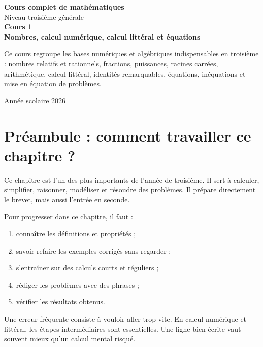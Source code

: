 \documentclass[11pt,a4paper]{article}
\begin{document}
\begin{titlepage}
\centering
\vspace*{2cm}
{\Huge \textbf{Cours complet de mathématiques}}\\[0.5cm]
{\Large Niveau troisième générale}\\[1.5cm]
{\Huge \textbf{Cours 1}}\\[0.4cm]
{\LARGE \textbf{Nombres, calcul numérique, calcul littéral et équations}}\\[1.5cm]
\begin{tcolorbox}[colframe=bleu,colback=blue!3!white,width=0.9\textwidth]
Ce cours regroupe les bases numériques et algébriques indispensables en troisième : nombres relatifs et rationnels, fractions, puissances, racines carrées, arithmétique, calcul littéral, identités remarquables, équations, inéquations et mise en équation de problèmes.
\end{tcolorbox}
\vfill
{\Large Année scolaire 2026}
\end{titlepage}

\tableofcontents
\newpage

\section*{Préambule : comment travailler ce chapitre ?}

Ce chapitre est l'un des plus importants de l'année de troisième. Il sert à calculer, simplifier, raisonner, modéliser et résoudre des problèmes. Il prépare directement le brevet, mais aussi l'entrée en seconde.

\begin{methode}
Pour progresser dans ce chapitre, il faut :
\begin{enumerate}
  \item connaître les définitions et propriétés ;
  \item savoir refaire les exemples corrigés sans regarder ;
  \item s'entraîner sur des calculs courts et réguliers ;
  \item rédiger les problèmes avec des phrases ;
  \item vérifier les résultats obtenus.
\end{enumerate}
\end{methode}

\begin{attention}
Une erreur fréquente consiste à vouloir aller trop vite. En calcul numérique et littéral, les étapes intermédiaires sont essentielles. Une ligne bien écrite vaut souvent mieux qu'un calcul mental risqué.
\end{attention}
\end{document}

